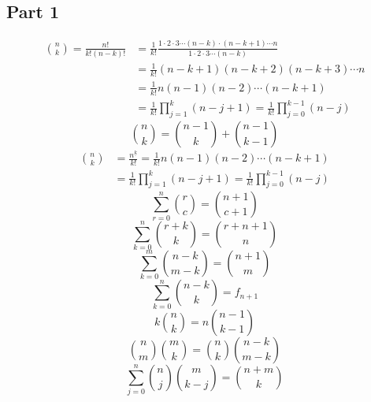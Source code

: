 
\subsection{Part 1}\label{subsec:part-1}
\begin{equation}
    \begin{split}
        \binom{n}{k} = \frac{n!}{k! (n-k)!}
        &= \frac{1}{k!} \frac{1 \cdot 2 \cdot 3 \cdots (n-k) \cdot (n-k+1) \cdots n}{1 \cdot 2 \cdot 3 \cdots (n-k)} \\
        &= \frac{1}{k!} (n-k+1) (n-k+2) (n-k+3) \cdots n \\
        &= \frac{1}{k!} n (n-1) (n-2) \cdots (n-k+1) \\
        &= \frac{1}{k!} \prod_{j=1}^{k} (n-j+1) = \frac{1}{k!} \prod_{j=0}^{k-1} (n-j)
    \end{split}
\end{equation}
\begin{equation}
    \binom{n}{k} = \binom{n-1}{k} + \binom{n-1}{k-1}
\end{equation}
\begin{equation}
    \begin{split}
        \binom{n}{k}
        &= \frac{n^{\underline{k}}}{k!} = \frac{1}{k!} n (n-1) (n-2) \cdots (n-k+1) \\
        &= \frac{1}{k!} \prod_{j=1}^{k} (n-j+1) = \frac{1}{k!} \prod_{j=0}^{k-1} (n-j)
    \end{split}
\end{equation}
\begin{equation}
    \sum_{r=0}^{n} \binom{r}{c} = \binom{n+1}{c+1}
\end{equation}
\begin{equation}
    \sum_{k=0}^{n} \binom{r+k}{k} = \binom{r+n+1}{n}
\end{equation}
\begin{equation}
    \sum_{k=0}^{m} \binom{n-k}{m-k} = \binom{n+1}{m}
\end{equation}
\begin{equation}
    \sum_{k=0}^{n} \binom{n-k}{k} = f_{n+1}
\end{equation}
\begin{equation}
    k \binom{n}{k} = n \binom{n-1}{k-1}
\end{equation}
\begin{equation}
    \binom{n}{m} \binom{m}{k} = \binom{n}{k} \binom{n-k}{m-k}
\end{equation}
\begin{equation}
    \sum_{j=0}^{n} \binom{n}{j} \binom{m}{k-j} = \binom{n+m}{k}
\end{equation}

